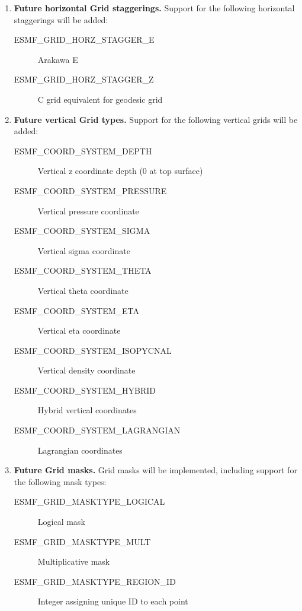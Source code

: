 \begin{enumerate}
\item {\bf Future horizontal Grid staggerings.}  Support for the following
horizontal staggerings will be added:
 \begin{description}
    \item [ESMF\_GRID\_HORZ\_STAGGER\_E]
          Arakawa E
    \item [ESMF\_GRID\_HORZ\_STAGGER\_Z]
          C grid equivalent for geodesic grid
 \end{description}

\item {\bf Future vertical Grid types.}  Support for the following
vertical grids will be added:
 \begin{description}
    \item [ESMF\_COORD\_SYSTEM\_DEPTH]
          Vertical z coordinate depth (0 at top surface)
    \item [ESMF\_COORD\_SYSTEM\_PRESSURE]
          Vertical pressure coordinate
    \item [ESMF\_COORD\_SYSTEM\_SIGMA]
          Vertical sigma coordinate
    \item [ESMF\_COORD\_SYSTEM\_THETA]
          Vertical theta coordinate
    \item [ESMF\_COORD\_SYSTEM\_ETA]
          Vertical eta coordinate
    \item [ESMF\_COORD\_SYSTEM\_ISOPYCNAL]
          Vertical density coordinate
    \item [ESMF\_COORD\_SYSTEM\_HYBRID]
          Hybrid vertical coordinates
    \item [ESMF\_COORD\_SYSTEM\_LAGRANGIAN]
          Lagrangian coordinates
 \end{description}

\item {\bf Future Grid masks.}  Grid masks will be implemented, including
support for the following mask types:
 \begin{description}
    \item [ESMF\_GRID\_MASKTYPE\_LOGICAL]
          Logical mask
    \item [ESMF\_GRID\_MASKTYPE\_MULT]
          Multiplicative mask
    \item [ESMF\_GRID\_MASKTYPE\_REGION\_ID]
          Integer assigning unique ID to each point
 \end{description}

\end{enumerate}


